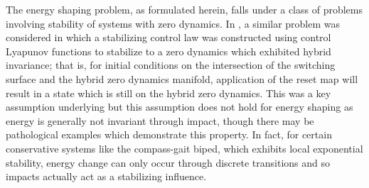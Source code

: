\documentclass[english]{article}
\begin{document}
The energy shaping problem, as formulated herein, falls under a class of
problems involving stability of systems with zero dynamics.
%
In \cite{Ames2014}, a similar problem was considered in which a stabilizing
control law was constructed using control Lyapunov functions to stabilize to a
zero dynamics which exhibited hybrid invariance; that is, for initial conditions
on the intersection of the switching surface and the hybrid zero dynamics
manifold, application of the reset map will result in a state which is still on
the hybrid zero dynamics.
%
This was a key assumption underlying \cite{Ames2014} but this assumption does
not hold for energy shaping as energy is generally not invariant through impact,
though there may be pathological examples which demonstrate this property.
%
In fact, for certain conservative systems like the compass-gait biped, which
exhibits local exponential stability, energy change can only occur through
discrete transitions and so impacts actually act as a stabilizing influence.
%
%
%



\end{document}
